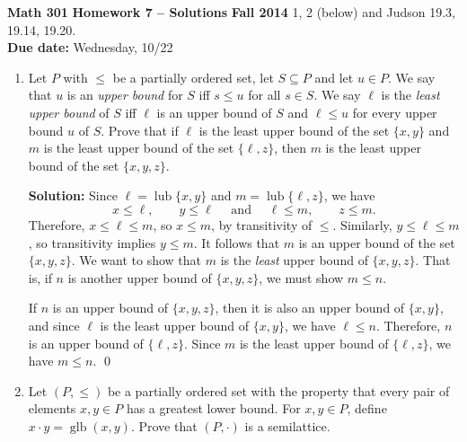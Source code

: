 \documentclass[12pt,reqno]{amsart}
\newcommand{\lub}{\ensuremath{\operatorname{lub}}}
\renewcommand{\>}{\ensuremath{\rangle}}
\newcommand{\<}{\ensuremath{\langle}}
\newcommand{\probskip}{\vskip1cm}
\begin{document}
\thispagestyle{empty}

\noindent \textbf{Math 301} \hskip4cm {\bf Homework 7 -- Solutions} \hfill {\bf Fall 2014}
\vskip1cm
 1, 2 (below) and Judson 19.3, 19.14, 19.20.\\
{\bf Due date:} Wednesday, 10/22

\bigskip

\begin{enumerate}[{\bf 1.}]

\item %
Let $P$ with $\leq$ be a partially ordered set, let $S \subseteq P$ and let
$u\in P$.  We say that $u$ is an \emph{upper bound} for $S$ iff $s\leq u$ for
all $s \in S$.  We say $\ell$ is the \emph{least upper bound} of $S$ iff $\ell$
is an upper bound of $S$ and $\ell \leq u$ for every upper bound $u$ of $S$.
Prove that if $\ell$ is the least upper bound of the set $\{x, y\}$ and $m$ is
the least upper bound of the set $\{\ell, z\}$, then $m$ is the least upper
bound of the set $\{x, y, z\}$.

\bigskip
\noindent
{\bf Solution:}
Since $\ell = \lub \{x, y\}$ and $m= \lub \{\ell, z\}$, we have 
\[
x\leq \ell, \qquad y \leq \ell  \quad  \text{ and } \quad \ell \leq m, \qquad z \leq m.
\]
Therefore, $x\leq \ell \leq m$, so $x\leq m$, by transitivity of $\leq$.
Similarly, $y\leq \ell \leq m$, so
transitivity implies $y\leq m$.  It follows that $m$ is an upper bound of the set
$\{x, y, z\}$.  We want to show that $m$ is the \emph{least} upper bound of 
$\{x, y, z\}$. That is, if $n$ is another upper bound of 
$\{x, y, z\}$, we must show $m\leq n$.

If $n$ is an upper bound of $\{x, y, z\}$, then it is also an upper bound of
$\{x, y\}$, and since $\ell$ is the least upper bound of $\{x,y\}$, we have
$\ell \leq n$.  Therefore, $n$ is an upper bound of $\{\ell, z\}$. Since $m$ is
the least upper bound of $\{\ell, z\}$, we have $m\leq n$.
\qed

\probskip

\item
Let $(P, \leq)$ be a partially ordered set with the property that every pair of
elements $x, y \in P$ has a greatest lower bound. For $x, y\in P$, define 
$x \cdot y = \operatorname{glb}(x,y)$. Prove that $(P, \cdot)$ is a semilattice.



\end{enumerate}
\end{document}
